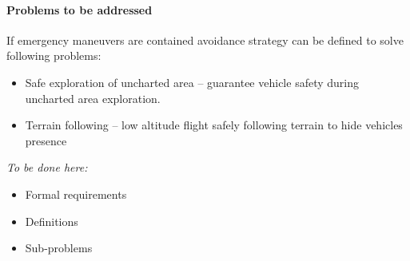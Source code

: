     \paragraph{Problems to be addressed}
    If emergency maneuvers are contained avoidance strategy can be defined to solve following problems:
    \begin{itemize}
        \item Safe exploration of uncharted area – guarantee vehicle safety during uncharted area exploration. 
        \item Terrain following – low altitude flight safely following terrain  to hide vehicles presence
    \end{itemize}
    
    \emph{To be done here:}
    \begin{itemize}
        \item Formal requirements
        \item Definitions
        \item Sub-problems
    \end{itemize}
    


